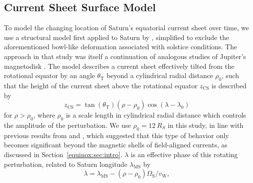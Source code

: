 \subsection{Current Sheet Surface Model}\label{equinox:sec:cssmodel}
To model the changing location of Saturn's equatorial current sheet over time, we use a structural model first applied to Saturn by \citet{arridge2011}, simplified to exclude the aforementioned bowl-like deformation associated with solstice conditions. The approach in that study was itself a continuation of analogous studies of Jupiter's magnetodisk \citep[e.g.][]{kivelson1978,khurana2005}. The model describes a current sheet effectively tilted from the rotational equator by an angle $\theta_\mathrm{T}$ beyond a cylindrical radial distance $\rho_0$, such that the height of the current sheet above the rotational equator $z_\mathrm{CS}$ is described by
\begin{equation}\label{equinox:eq:zcs}
z_\mathrm{CS} = \tan(\theta_\mathrm{T})(\rho-\rho_0)\cos(\lambda-\lambda_0)
\end{equation}
for $\rho > \rho_0$, where $\rho_0$ is a scale length in cylindrical radial distance which controls the amplitude of the perturbation. We use $\rho_0 = \SI{12}{R_S}$ in this study, in line with previous results from \citet{southwood2007} and \citet{arridge2011}, which suggested that this type of behavior only becomes significant beyond the magnetic shells of field-aligned currents, as discussed in Section~\ref{equinox:sec:intro}. $\lambda$ is an effective phase of this rotating perturbation, related to Saturn longitude $\lambda_\mathrm{MS}$ by
\begin{equation}\label{equinox:eq:lambda}
\lambda = \lambda_\mathrm{MS} - (\rho-\rho_0)\Omega_\mathrm{S}/v_\mathrm{W},
\end{equation}
